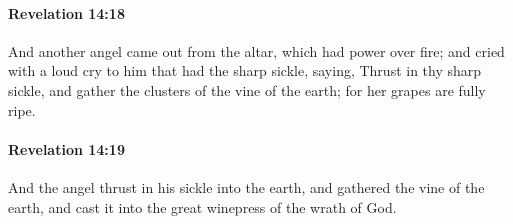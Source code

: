 		\paragraph{Revelation 14:18} %
			\label{REVELATIONNT-14-18}

			And another angel came out from the altar, which had power over fire; and cried with a loud cry to him that had the sharp sickle, saying, Thrust in thy sharp sickle, and gather the clusters of the vine of the earth; for her grapes are fully ripe.

			\begin{framed}
			\scriptsize
				\begin{compactdesc}
					\item[SBLG] 
				\end{compactdesc}
			\end{framed}

		\paragraph{Revelation 14:19} %
			\label{REVELATIONNT-14-19}

			And the angel thrust in his sickle into the earth, and gathered the vine of the earth, and cast it into the great winepress of the wrath of God.

